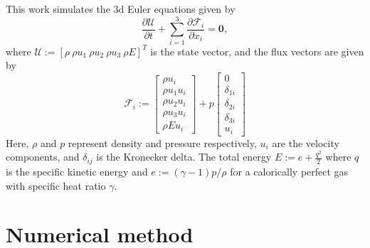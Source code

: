 \documentclass[a4paper,11pt,oneside]{article}
\newcommand{\vect}[1]{\ensuremath{\boldsymbol{\mathbf{#1}}}} %
\newcommand{\pder}[2]{\frac{\partial #1}{\partial #2}} %
\newcommand{\defeq}{\ensuremath{:=}} %
\newcommand{\eulerphy}[1]{\ensuremath{\mathcal{#1}}} %
\begin{document}
This work simulates the 3d Euler equations given by
\begin{equation}
	\pder{\vect{\eulerphy{U}}}{t} + \sum_{i=1}^{3} \pder{\vect{\eulerphy{F}}_i}{x_i} = \vect{0},
	\label{eq:3d_euler}
\end{equation}
where $\vect{\eulerphy{U}} \defeq \left[ \rho\ \rho u_1\ \rho u_2\ \rho u_3\ \rho E \right]^T$ is the state vector, and the flux vectors are given by
\begin{equation}
	\vect{\eulerphy{F}}_i \defeq
	\begin{bmatrix}
		\rho u_i\\
		\rho u_1 u_i\\
		\rho u_2 u_i\\
		\rho u_3 u_i\\
		\rho E u_i
	\end{bmatrix}
	+ p
	\begin{bmatrix}
		0\\
		\delta_{1i}\\
		\delta_{2i}\\
		\delta_{3i}\\
		u_i
	\end{bmatrix}
	\label{eq:3d_euler_flux_tensor}
\end{equation}
Here, $\rho$ and $p$ represent density and pressure respectively, $u_i$ are the velocity components, and $\delta_{ij}$ is the Kronecker delta. The total energy $E \defeq e + \frac{q^2}{2}$ where $q$ is the specific kinetic energy and $e \defeq (\gamma-1)p/\rho$ for a calorically perfect gas with specific heat ratio $\gamma$.



\section{Numerical method}
\label{sec:num_method}
\end{document}
